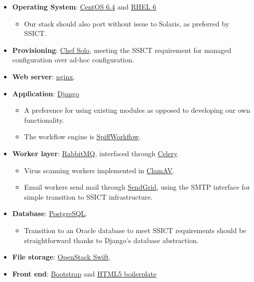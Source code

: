 \documentclass[12pt,a4paper,twosided]{article}
\begin{document}
\begin{itemize}

\item
  \textbf{Operating System}: \href{https://www.centos.org/}{CentOS 6.4} and \href{http://www.redhat.com/products/enterprise-linux/}{RHEL 6}

  \begin{itemize}
  
  \item
    Our stack should also port without issue to Solaris, as preferred by
    SSICT.
  \end{itemize}
\item
  \textbf{Provisioning}: \href{http://www.opscode.com/chef/}{Chef Solo},
  meeting the SSICT requirement for managed configuration over ad-hoc
  configuration.
\item
  \textbf{Web server}: \href{http://nginx.org/en}{nginx}.
\item
  \textbf{Application}: \href{http://django.org}{Django}

  \begin{itemize}
  
  \item
    A preference for using existing modules as opposed to developing our
    own functionality.
  \item
    The workflow engine is
    \href{https://github.com/knipknap/SpiffWorkflow}{SpiffWorkflow}.
  \end{itemize}
\item
  \textbf{Worker layer}: \href{http://rabbitmq.com}{RabbitMQ},
  interfaced through \href{http://www.celeryproject.org/}{Celery}.

  \begin{itemize}
  
  \item
    Virus scanning workers implemented in
    \href{http://www.clamav.net/lang/en/}{ClamAV}.
  \item
    Email workers send mail through \href{http://sendgrid.com/}{SendGrid}, using the SMTP interface
    for simple transition to SSICT infrastructure.
  \end{itemize}
\item
  \textbf{Database}: \href{http://postgresql.org}{PostgreSQL}.

  \begin{itemize}
  
  \item
    Transition to an Oracle database to meet SSICT requirements should
    be straightforward thanks to Django's database abstraction.
  \end{itemize}
\item
  \textbf{File storage}: \href{http://swift.openstack.org}{OpenStack
  Swift}.
\item
  \textbf{Front end}: \href{http://getbootstrap.com/}{Bootstrap} and
  \href{http://html5boilerplate.com/}{HTML5 boilerplate}


\end{itemize}
\end{document}
